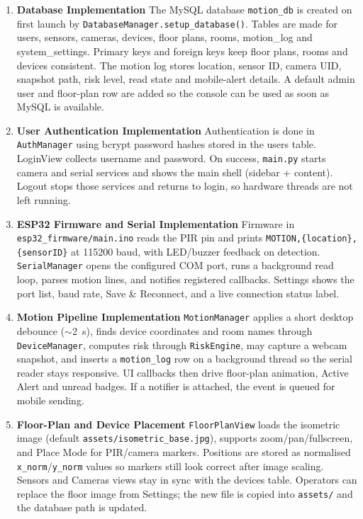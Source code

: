 \documentclass[12pt,a4paper]{report}
\begin{document}
\begin{enumerate}

\item \textbf{Database Implementation}
The MySQL database \texttt{motion\_db} is created on first launch by \texttt{DatabaseManager.setup\_database()}. Tables are made for users, sensors, cameras, devices, floor plans, rooms, motion\_log and system\_settings. Primary keys and foreign keys keep floor plans, rooms and devices consistent. The motion log stores location, sensor ID, camera UID, snapshot path, risk level, read state and mobile-alert details. A default admin user and floor-plan row are added so the console can be used as soon as MySQL is available.

\item \textbf{User Authentication Implementation}
Authentication is done in \texttt{AuthManager} using bcrypt password hashes stored in the users table. LoginView collects username and password. On success, \texttt{main.py} starts camera and serial services and shows the main shell (sidebar + content). Logout stops those services and returns to login, so hardware threads are not left running.

\item \textbf{ESP32 Firmware and Serial Implementation}
Firmware in \texttt{esp32\_firmware/main.ino} reads the PIR pin and prints \texttt{MOTION,\{location\},\{sensorID\}} at 115200 baud, with LED/buzzer feedback on detection. \texttt{SerialManager} opens the configured COM port, runs a background read loop, parses motion lines, and notifies registered callbacks. Settings shows the port list, baud rate, Save \& Reconnect, and a live connection status label.

\item \textbf{Motion Pipeline Implementation}
\texttt{MotionManager} applies a short desktop debounce ($\sim$2~s), finds device coordinates and room names through \texttt{DeviceManager}, computes risk through \texttt{RiskEngine}, may capture a webcam snapshot, and inserts a \texttt{motion\_log} row on a background thread so the serial reader stays responsive. UI callbacks then drive floor-plan animation, Active Alert and unread badges. If a notifier is attached, the event is queued for mobile sending.

\item \textbf{Floor-Plan and Device Placement}
\texttt{FloorPlanView} loads the isometric image (default \texttt{assets/isometric\_base.jpg}), supports zoom/pan/fullscreen, and Place Mode for PIR/camera markers. Positions are stored as normalised \texttt{x\_norm}/\texttt{y\_norm} values so markers still look correct after image scaling. Sensors and Cameras views stay in sync with the devices table. Operators can replace the floor image from Settings; the new file is copied into \texttt{assets/} and the database path is updated.


\end{enumerate}
\end{document}
